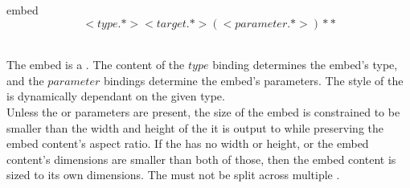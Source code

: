 \begin{identifier}{embed}
\[ <type .*> <target .*>( <parameter .*>)* *\]
\end{identifier}
 \\

The embed is a . The content of the \inline$type$ binding determines the embed's type, and the \inline$parameter$ bindings determine the embed's parameters. The style of the  is dynamically dependant on the given type. \\

Unless the  or  parameters are present, the size of the embed  is constrained to be smaller than the width and height of the  it is output to while preserving the embed content's aspect ratio. If the  has no width or height, or the embed content's dimensions are smaller than both of those, then the embed content is sized to its own dimensions. The  must not be split across multiple .\\




